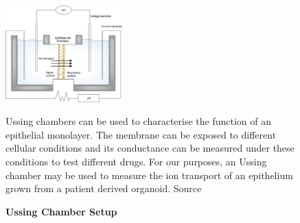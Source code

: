 \begin{figure}
	\label{ussing_chamber}
	\begin{center}
	\includegraphics[width=0.4\textwidth]{figures/ussing_chamber.jpg}
	\end{center}
	\captionsetup{singlelinecheck = false, justification=raggedright}
	\caption[Ussing Chamber Setup] {\textbf{Ussing Chamber Setup}}{Ussing chambers can be used to characterise the function of an epithelial monolayer. The membrane can be exposed to different cellular conditions and its conductance can be measured under these conditions to test different drugs. For our purposes, an Ussing chamber may be used to measure the ion transport of an epithelium grown from a patient derived organoid. Source \cite{hoenig2014}} 
\end{figure}


